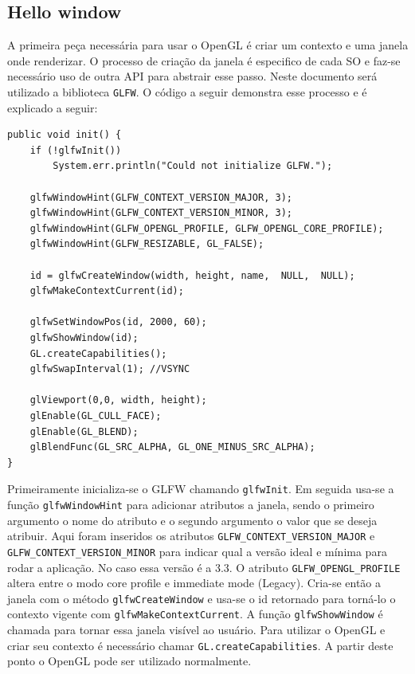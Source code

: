 \documentclass[12pt, 
openright, 
oneside, 
a4paper,    
brazil]{facom-ufu-abntex2}
\begin{document}
\subsection{Hello window}
A primeira peça necessária para usar o OpenGL é criar um contexto e uma janela onde renderizar. O processo de criação da janela é especifico de cada SO e faz-se necessário uso de outra API para abstrair esse passo. Neste documento será utilizado a biblioteca \texttt{GLFW}. O código a seguir demonstra esse processo e é explicado a seguir:
\begin{lstlisting}[caption=Inicialização da janela e contexto OpenGL]
public void init() {
	if (!glfwInit()) 
		System.err.println("Could not initialize GLFW.");

	glfwWindowHint(GLFW_CONTEXT_VERSION_MAJOR, 3);
	glfwWindowHint(GLFW_CONTEXT_VERSION_MINOR, 3);
	glfwWindowHint(GLFW_OPENGL_PROFILE, GLFW_OPENGL_CORE_PROFILE);
	glfwWindowHint(GLFW_RESIZABLE, GL_FALSE);

	id = glfwCreateWindow(width, height, name,  NULL,  NULL);
	glfwMakeContextCurrent(id);

	glfwSetWindowPos(id, 2000, 60);
	glfwShowWindow(id);
	GL.createCapabilities();
	glfwSwapInterval(1); //VSYNC

	glViewport(0,0, width, height);
	glEnable(GL_CULL_FACE);
	glEnable(GL_BLEND);
	glBlendFunc(GL_SRC_ALPHA, GL_ONE_MINUS_SRC_ALPHA);
}
\end{lstlisting}
Primeiramente inicializa-se o GLFW chamando \texttt{glfwInit}. Em seguida usa-se a função \texttt{glfwWindowHint} para adicionar atributos a janela, sendo o primeiro argumento o nome do atributo e o segundo argumento o valor que se deseja atribuir. Aqui foram inseridos os atributos \texttt{GLFW_CONTEXT_VERSION_MAJOR} e \texttt{GLFW_CONTEXT_VERSION_MINOR} para indicar qual a versão ideal e mínima para rodar a aplicação. No caso essa versão é a 3.3. O atributo \texttt{GLFW_OPENGL_PROFILE} altera entre o modo core profile e immediate mode (Legacy). Cria-se então a janela com o método \texttt{glfwCreateWindow} e usa-se o id retornado para torná-lo o contexto vigente com \texttt{glfwMakeContextCurrent}. A função \texttt{glfwShowWindow} é chamada para tornar essa janela visível ao usuário. Para utilizar o OpenGL e criar seu contexto é necessário chamar \texttt{GL.createCapabilities}. A partir deste ponto o OpenGL pode ser utilizado normalmente.
\end{document}
